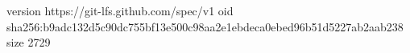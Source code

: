 version https://git-lfs.github.com/spec/v1
oid sha256:b9adc132d5c90dc755bf13e500c98aa2e1ebdeca0ebed96b51d5227ab2aab238
size 2729
